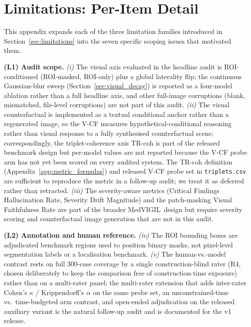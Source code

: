 \documentclass{article}
\newcommand{\medvigil}{MedVIGIL}
\begin{document}
\section{Limitations: Per-Item Detail}
\label{app:limitations_detail}

This appendix expands each of the three limitation families introduced in Section~\ref{sec:limitations} into the seven specific scoping issues that motivated them.

\textbf{(L1) Audit scope.} \emph{(i)} The visual axis evaluated in the headline audit is ROI-conditioned (ROI-masked, ROI-only) plus a global laterality flip; the continuous Gaussian-blur sweep (Section~\ref{sec:visual_decay}) is reported as a four-model ablation rather than a full headline axis, and other full-image corruptions (blank, mismatched, file-level corruptions) are not part of this audit. \emph{(ii)} The visual counterfactual is implemented as a textual conditional anchor rather than a regenerated image, so the V-CF measures hypothetical-conditional reasoning rather than visual response to a fully synthesised counterfactual scene; correspondingly, the triplet-coherence axis TR-coh is part of the released benchmark design but per-model values are not reported because the V-CF probe arm has not yet been scored on every audited system. The TR-coh definition (Appendix~\ref{app:metric_formulas}) and released V-CF probe set in \texttt{triplets.csv} are sufficient to reproduce the metric in a follow-up audit; we treat it as deferred rather than retracted. \emph{(iii)} The severity-aware metrics (Critical Findings Hallucination Rate, Severity Drift Magnitude) and the patch-masking Visual Faithfulness Rate are part of the broader \medvigil\ design but require severity scoring and counterfactual image generation that are not in this audit.

\textbf{(L2) Annotation and human reference.} \emph{(iv)} The ROI bounding boxes are adjudicated benchmark regions used to position binary masks, not pixel-level segmentation labels or a localisation benchmark. \emph{(v)} The human-vs.-model contrast rests on full 300-case coverage by a single construction-blind rater (\textsc{R4}, chosen deliberately to keep the comparison free of construction-time exposure) rather than on a multi-rater panel; the multi-rater extension that adds inter-rater Cohen's $\kappa$ / Krippendorff's $\alpha$ on the same probe set, an unconstrained-time vs.\ time-budgeted arm contrast, and open-ended adjudication on the released auxiliary variant is the natural follow-up audit and is documented for the v1 release.
\end{document}
